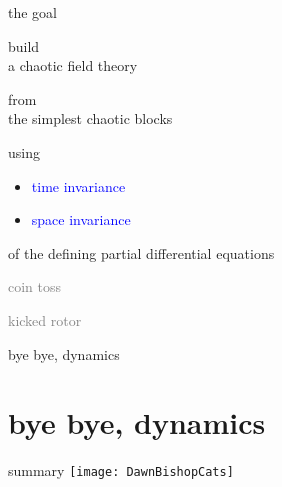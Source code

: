 \begin{frame}
  \titlepage
\end{frame} %


\begin{frame}{the goal}
\vfill

\begin{center}
{\Large build
\\
a chaotic field theory
\medskip

from
\\
the simplest chaotic blocks}
\end{center}

\vfill
using
\begin{itemize}
  \item
\textcolor{blue}{time invariance}
  \item
\textcolor{blue}{space invariance}
\end{itemize}
 of the defining partial differential equations
\end{frame} %

\begin{frame}{}
\begin{enumerate}
              \item \textcolor{gray}{\small
coin toss
              \item
kicked rotor
              \item
\catlatt
                  }
              \item {\Large
bye bye, dynamics
                    }
            \end{enumerate}
\end{frame} %

\section[bye bye, dynamics]
 {bye bye, dynamics}
\label{s:byeDynamics}


\begin{frame}{summary}
\catlatt\hfill\texttt{[image: DawnBishopCats]}
\end{frame} %

